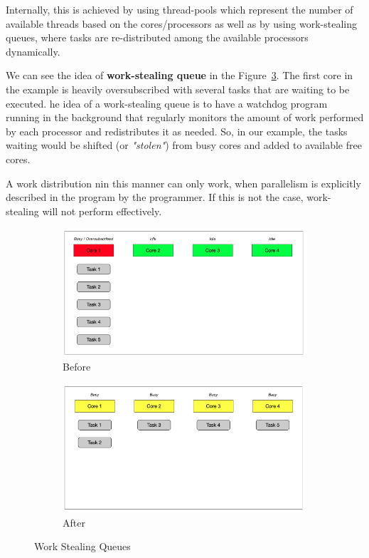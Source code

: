 \documentclass[11pt, a4paper]{article}
\begin{document}
Internally, this is achieved by using thread-pools which represent the number of available threads based on the cores/processors as well as by using work-stealing queues, where tasks are re-distributed among the available processors dynamically.


We can see the idea of \textbf{work-stealing queue} in the Figure~\ref{fig:work_stealing_queues}. The first core in the example is heavily oversubscribed with several tasks that are waiting to be executed. he idea of a work-stealing queue is to have a watchdog program running in the background that regularly monitors the amount of work performed by each processor and redistributes it as needed. So, in our example, the tasks waiting would be shifted (or \textit{"stolen"}) from busy cores and added to available free cores.

A work distribution nin this manner can only work, when parallelism is explicitly described in the program by the programmer. If this is not the case, work-stealing will not perform effectively.

\begin{figure}[htpb!]
\begin{subfigure}{.5\textwidth}
  \centering
  \includegraphics[width=.9\linewidth]{task_dist_1}  
  \caption{Before}
	\label{fig:before}
\end{subfigure}
\begin{subfigure}{.5\textwidth}
  \centering
  \includegraphics[width=.9\linewidth]{task_dist_2}  
  \caption{After}
	\label{fig:after}
\end{subfigure}
\caption{Work Stealing Queues}
\label{fig:work_stealing_queues}
\end{figure}
\end{document}
